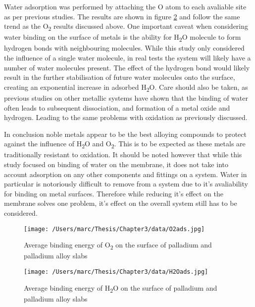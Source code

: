 Water adsorption was performed by attaching the O atom to each avaliable site as per previous studies. \cite{Roques2009} The results are shown in figure \ref{H2Oads} and follow the same trend as the O\textsubscript{2} results discussed above. One important caveat when considering water binding on the surface of metals is the ability for H\textsubscript{2}O molecule to form hydrogen bonds with neighbouring molecules.\cite{PhysRevB.69.195404} While this study only considered the influence of a single water molecule, in real tests the system will likely have a number of water molecules present. The effect of the hydrogen bond would likely result in the further stabilisation of future water molecules onto the surface, creating an exponential increase in adsorbed H\textsubscript{2}O. \cite{PhysRevB.69.195404} Care should also be taken, as previous studies on other metallic systems have shown that the binding of water often leads to subsequent dissociation, and formation of a metal oxide and hydrogen. Leading to the same problems with oxidation as previously discussed. \cite{doi:10.1021/jz300994e}

In conclusion noble metals appear to be the best alloying compounds to protect against the influence of H\textsubscript{2}O and O\textsubscript{2}. This is to be expected as these metals are traditionally resistant to oxidation. It should be noted however that while this study focused on binding of water on the membrane, it does not take into account adsorption on any other components and fittings on a system. Water in particular is notoriously difficult to remove from a system due to it's avaliability for binding on metal surfaces.\cite{BACQUART20205565} Therefore while reducing it's effect on the membrane solves one problem, it's effect on the overall system still has to be considered. 

\begin{landscape}
  \begin{figure}
      \centering
      \texttt{[image: /Users/marc/Thesis/Chapter3/data/O2ads.jpg]}
      \caption{Average binding energy of O\textsubscript{2} on the surface of palladium and palladium alloy slabs}
      \label{O2ads}
    \end{figure}
  
  \end{landscape}


\begin{landscape}
  \begin{figure}
      \centering
      \texttt{[image: /Users/marc/Thesis/Chapter3/data/H2Oads.jpg]}
      \caption{Average binding energy of H\textsubscript{2}O on the surface of palladium and palladium alloy slabs}
      \label{H2Oads}
    \end{figure}
  
  \end{landscape}


